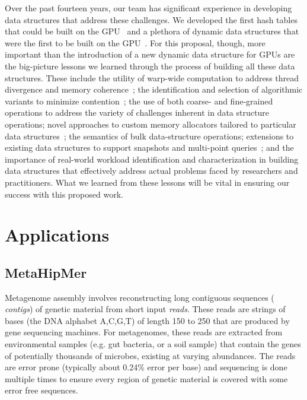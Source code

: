 Over the past fourteen years, our team has significant experience in developing data structures that address these challenges. We developed the first hash tables that could be built on the GPU~\cite{Alcantara:2009:RPH,Alcantara:2011:BAE} and a plethora of dynamic data structures that were the first to be built on the GPU~\cite{Ashkiani:2018:ADH,Ashkiani:2018:GLA,Awad:2019:EAH,Geil:2018:QFA}. For this proposal, though, more important than the introduction of a new dynamic data structure for GPUs are the big-picture lessons we learned through the process of building all these data structures. These include the utility of warp-wide computation to address thread divergence and memory coherence~\cite{Ashkiani:2017:PAA}; the identification and selection of algorithmic variants to minimize contention~\cite{Awad:2019:EAH}; the use of both coarse- and fine-grained operations to address the variety of challenges inherent in data structure operations; novel approaches to custom memory allocators tailored to particular data structures~\cite{Ashkiani:2018:ADH}; the semantics of bulk data-structure operations; extensions to existing data structures to support snapshots and multi-point queries~\cite{Awad:2022:AGM}; and the importance of real-world workload identification and characterization in building data structures that effectively address actual problems faced by researchers and practitioners. What we learned from these lessons will be vital in ensuring our success with this proposed work.

\section{Applications}

\subsection{MetaHipMer}

Metagenome assembly involves reconstructing long contiguous sequences ({\it
contigs}) of genetic material from short input {\it reads}. These reads are
strings of bases (the DNA alphabet A,C,G,T) of length 150 to 250 that are
produced by gene sequencing machines.  For metagenomes, these reads are
extracted from environmental samples (e.g. gut bacteria, or a soil sample) that
contain the genes of potentially thousands of microbes, existing at varying
abundances.  The reads are error prone (typically about 0.24\% error per base)
and sequencing is done multiple times to ensure every region of genetic material
is covered with some error free sequences.

